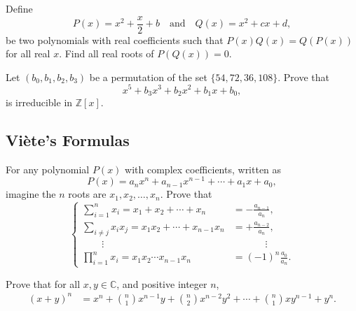 \begin{question}[name={2017 Romania}]
    Define \[P(x)=x^2+\dfrac x 2 +b\quad \text{and} \quad Q(x)=x^2+cx+d,\] be two polynomials with real coefficients such that $P(x)Q(x)=Q(P(x))$ for all real $x$. Find all real roots of $P(Q(x))=0$.
\end{question}

\begin{question}[name={2008 Iran Third Round}]
    Let $(b_0,b_1,b_2,b_3)$ be a permutation of the set $\{54,72,36,108\}$. Prove that \[x^5+b_3x^3+b_2x^2+b_1x+b_0,\] is irreducible in $\mathbb Z[x]$.
\end{question}


\subsection{Viète's Formulas}

\begin{tcolorbox}[title={Vieta's Formulas}]
    \begin{theorem}
    For any polynomial $P(x)$ with complex coefficients, written as
    \[P(x)=a_nx^n+a_{n-1}x^{n-1} + \cdots + a_1x + a_0,\]
    imagine the $n$ roots are $x_1,x_2,\dots,x_n$. Prove that
    \[
        \begin{cases}
            \displaystyle \sum_{i=1}^n x_i = x_1+x_2+\cdots+x_n &= \displaystyle -\frac{a_{n-1}}{a_n},\\
            \displaystyle \sum_{i\neq j} x_ix_j = x_1x_2+\cdots+x_{n-1}x_n &= \displaystyle +\frac{a_{n-2}}{a_n},\\
            \qquad \vdots &\phantom{=} \qquad \vdots\\
            \displaystyle \prod_{i=1}^n x_i= x_1x_2\cdots x_{n-1}x_n &= \displaystyle (-1)^{n}\frac{a_0}{a_n}.
        \end{cases}
    \]
\end{theorem}
\end{tcolorbox}

\begin{tcolorbox}[title={Binomial Theorem}]
\begin{theorem}
    Prove that for all $x,y \in \mathbb C$, and positive integer $n$,
    \begin{align*}
        (x+y)^n &= x^n + \binom{n}{1}x^{n-1}y + \binom{n}{2}x^{n-2}y^2 + \cdots + \binom{n}{1}xy^{n-1} + y^n.
    \end{align*}
\end{theorem}
\end{tcolorbox}

